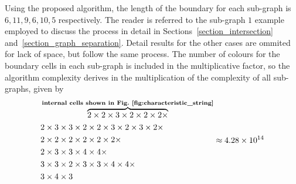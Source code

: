 \documentclass[journal]{IEEEtran}
\begin{document}
Using the proposed algorithm, the length of the boundary for each sub-graph is $6, 11, 9, 6, 10, 5$ respectively. The reader is referred to the sub-graph $1$ example
employed to discuss the process in detail in Sections~\ref{section_intersection} and~\ref{section_graph_separation}. Detail results for the other cases are ommited for lack of space, 
but follow the same process. 
The number of colours for the boundary cells in each sub-graph is included in the multiplicative factor, so the algorithm complexity derives in the multiplication of 
the complexity of all sub-graphs, given by 
\begin{equation}
\begin{aligned}
&\overbrace{2\times2\times3\times2\times2\times2\times}^{\textbf{internal cells shown in Fig.~\ref{fig:characteristic_string}}}\\
&2\times3\times3\times2\times2\times3\times2\times3\times2\times\\
&2\times2\times2\times2\times2\times2\times\\
&2\times3\times3\times4\times4\times\\
&3\times3\times2\times3\times3\times4\times4\times\\
&3\times4\times3
\end{aligned} \approx 4.28\times10^{14}
\end{equation}
\end{document}
